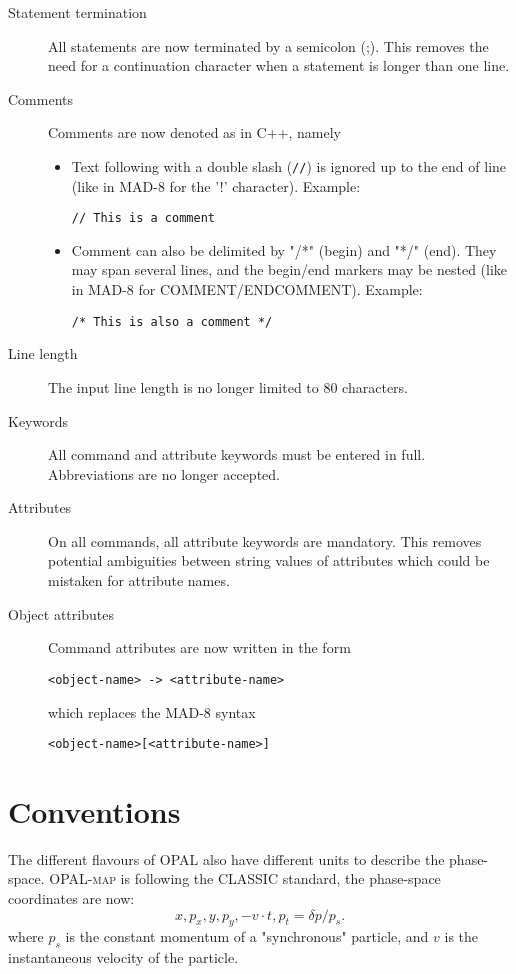 \documentclass{article}
\newcommand{\opal}{\textsc{OPAL }}
\newcommand{\opalmap}{\textsc{OPAL-map }}
\begin{document}
\begin{description}
\item[Statement termination]
  All statements are now terminated by a semicolon (;).
  This removes the need for a continuation character when a statement is 
  longer than one line.

\item[Comments]
  Comments are now denoted as in C++, namely
  \begin{itemize}
  \item Text following with a double slash (\texttt{//}) is ignored up to
    the end of line (like in MAD-8 for the '!' character). 
    Example:
\begin{verbatim}
// This is a comment
\end{verbatim}
  \item Comment can also be delimited by "/*" (begin) and "*/" (end). 
    They may span several lines, and the begin/end markers may be nested
    (like in MAD-8 for COMMENT/ENDCOMMENT).
    Example:
\begin{verbatim}
/* This is also a comment */
\end{verbatim}
  \end{itemize}

\item[Line length]
  The input line length is no longer limited to 80 characters.

\item[Keywords]
  All command and attribute keywords must be entered in full.
  Abbreviations are no longer accepted.

\item[Attributes]
  On all commands, all attribute keywords are mandatory.
  This removes potential ambiguities between string values of attributes
  which could be mistaken for attribute names.

\item[Object attributes]
  Command attributes are now written in the form
\begin{verbatim}
<object-name> -> <attribute-name>
\end{verbatim}
  which replaces the MAD-8 syntax
\begin{verbatim}
<object-name>[<attribute-name>]
\end{verbatim}
\end{description}

\section{Conventions}
The different flavours of \opal also have different units to describe the phase-space.
\opalmap is following the CLASSIC standard, the phase-space coordinates are now:
\[
x, p_{x}, y, p_{y}, - v\cdot t, p_{t} = \delta p / p_{s}.
\]
where $p_{s}$ is the constant momentum of a "synchronous"
particle, and $v$ is the instantaneous velocity of the particle.
\end{document}
